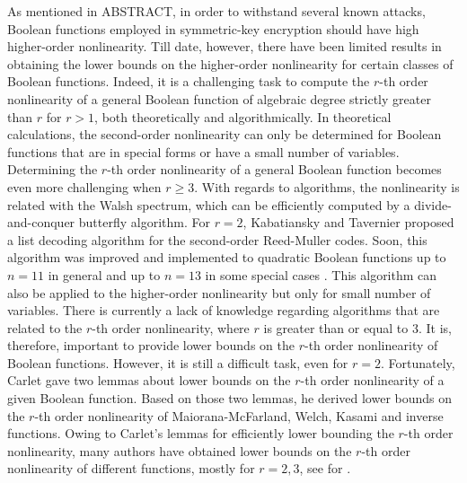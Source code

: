 \documentclass[preprint,10pt]{elsarticle}
\newcommand{\0}{\textbf{0}}
\newcommand{\1}{\textbf{1}}
\theoremstyle{plain}
\begin{document}
    As mentioned in ABSTRACT, 
    in order to withstand several known attacks, Boolean functions employed in symmetric-key encryption should have high higher-order nonlinearity.
    Till date, however, 
    there have been limited results in obtaining the lower bounds on the higher-order nonlinearity for certain classes of Boolean functions. 
    Indeed, it is a challenging task to compute the $r$-th order nonlinearity of a general Boolean function of algebraic degree strictly greater than $r$ for $r>1$, both theoretically and algorithmically.
    In theoretical calculations, 
    the second-order nonlinearity can only be determined for Boolean functions that are in special forms or have a small number of variables.
    Determining the $r$-th order nonlinearity of a general Boolean function becomes even more challenging when $r\ge 3$.
    With regards to algorithms, the nonlinearity is related with the Walsh spectrum, which can be efficiently computed by a divide-and-conquer butterfly algorithm.
    For $r=2$, 
    Kabatiansky and Tavernier \cite{KabatianskyT2005listdecoding_RM_2_n} proposed a list decoding algorithm for the second-order Reed-Muller codes.
    Soon, this algorithm was improved and implemented to quadratic Boolean functions up to $n=11$ in general and up to $n=13$ in some special cases \cite{FourquetT2008improved_listdecoding_RM_2_n}.
    This algorithm can also be applied to the higher-order nonlinearity but only for small number of variables.
    There is currently a lack of knowledge regarding algorithms that are related to the $r$-th order nonlinearity, where $r$ is greater than or equal to $3$.
    It is, therefore, important to provide lower bounds on the $r$-th order nonlinearity of Boolean functions.
    However, it is still a difficult task, even for $r=2$.
    Fortunately, Carlet \cite{Carlet2008lowbound_NL_profile} gave two lemmas about lower bounds on the $r$-th order nonlinearity of a given Boolean function.
    Based on those two lemmas, he derived lower bounds on the $r$-th order nonlinearity of Maiorana-McFarland, Welch, Kasami and inverse functions.
    Owing to Carlet's lemmas for efficiently lower bounding the $r$-th order nonlinearity, many authors have obtained lower bounds on
    the $r$-th order nonlinearity of different functions, mostly for $r=2,3$, see for \cite{Carlet2011NL_Profile_Dillon,GangopadhyayST2010NL_2,GaoT2017NL_2_MM,GodeG2010NL_3Kasami,Liu2023NL_2,SihemKJ2020NL_2cubic,SarkarG2009NL_2MM,Singh2014NL_3_biquadratic,SunW2009NL_2,SunW2011NL_2,TangCT2013NL_2bent,TangYZZ2020NL_2bent,YanT2020NL_2}.
\end{document}
